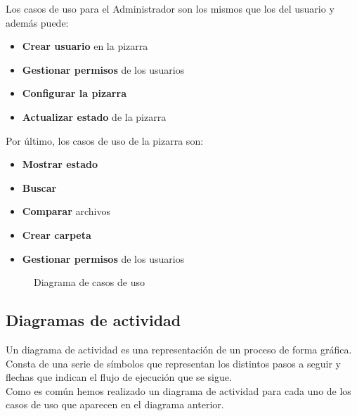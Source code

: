 Los casos de uso para el Administrador son los mismos que los del usuario y además puede:
\begin{itemize}
\item \textbf{Crear usuario} en la pizarra
\item \textbf{Gestionar permisos} de los usuarios
\item \textbf{Configurar la pizarra}
\item \textbf{Actualizar estado} de la pizarra
\end{itemize}

Por último, los casos de uso de la pizarra son:
\begin{itemize}
\item \textbf{Mostrar estado}
\item \textbf{Buscar}
\item \textbf{Comparar} archivos
\item \textbf{Crear carpeta}
\item \textbf{Gestionar permisos} de los usuarios
\end{itemize} 

\begin{landscape}
\begin{figure}[!h]
\centering
\casos
\caption{Diagrama de casos de uso}
\end{figure}
\end{landscape}

\subsection{Diagramas de actividad}
Un diagrama de actividad es una representación de un proceso de forma gráfica. Consta de una serie de símbolos que representan los distintos pasos a seguir y flechas que indican el flujo de ejecución que se sigue.\\

Como es común hemos realizado un diagrama de actividad para cada uno de los casos de uso que aparecen en el diagrama anterior.

